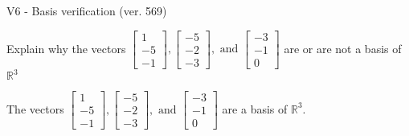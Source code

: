 \begin{exercise}
  \begin{exerciseTitle}V6 - Basis verification (ver. 569)\end{exerciseTitle}
  \begin{exerciseStatement}
    Explain why the vectors \(\left[\begin{array}{r}
1 \\
-5 \\
-1
\end{array}\right] , \left[\begin{array}{r}
-5 \\
-2 \\
-3
\end{array}\right] , \text{ and } \left[\begin{array}{r}
-3 \\
-1 \\
0
\end{array}\right]\) are or are not a basis of \(\mathbb{R}^3\)	


  \end{exerciseStatement}
  \begin{exerciseAnswer}
   The vectors \(\left[\begin{array}{r}
1 \\
-5 \\
-1
\end{array}\right] , \left[\begin{array}{r}
-5 \\
-2 \\
-3
\end{array}\right] , \text{ and } \left[\begin{array}{r}
-3 \\
-1 \\
0
\end{array}\right]\) 
  	 are  a basis of \(\mathbb{R}^3\).
  


  \end{exerciseAnswer}
\end{exercise}